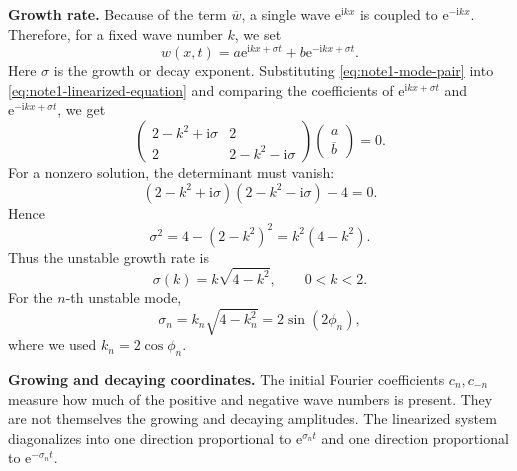 \documentclass{amsart}
\newcounter{note}
\numberwithin{equation}{hw}
\newcommand{\noteheading}[1]{\vspace{1em}\noindent\textbf{#1}}
\begin{document}
\noteheading{Growth rate.}
Because of the term \(\overline{w}\), a single wave
\(\mathrm{e}^{\mathrm{i}kx}\) is coupled to
\(\mathrm{e}^{-\mathrm{i}kx}\).  Therefore, for a fixed wave number \(k\),
we set
\begin{equation}
w(x,t)
=
a\mathrm{e}^{\mathrm{i}kx+\sigma t}
+
b\mathrm{e}^{-\mathrm{i}kx+\sigma t}.
\label{eq:note1-mode-pair}
\end{equation}
Here \(\sigma\) is the growth or decay exponent.  Substituting
\eqref{eq:note1-mode-pair} into \eqref{eq:note1-linearized-equation} and
comparing the coefficients of
\(\mathrm{e}^{\mathrm{i}kx+\sigma t}\) and
\(\mathrm{e}^{-\mathrm{i}kx+\sigma t}\), we get
\begin{equation}
\begin{pmatrix}
2-k^2+\mathrm{i}\sigma & 2
\\
2 & 2-k^2-\mathrm{i}\sigma
\end{pmatrix}
\begin{pmatrix}
a\\
\overline{b}
\end{pmatrix}
=0.
\label{eq:note1-growth-system}
\end{equation}
For a nonzero solution, the determinant must vanish:
\begin{equation}
(2-k^2+\mathrm{i}\sigma)(2-k^2-\mathrm{i}\sigma)-4=0.
\label{eq:note1-determinant-condition}
\end{equation}
Hence
\begin{equation}
\sigma^2
=
4-(2-k^2)^2
=
k^2(4-k^2).
\label{eq:note1-dispersion-relation}
\end{equation}
Thus the unstable growth rate is
\begin{equation}
\sigma(k)=k\sqrt{4-k^2},
\qquad
0<k<2.
\label{eq:note1-growth-rate}
\end{equation}
For the \(n\)-th unstable mode,
\begin{equation}
\sigma_n
=
k_n\sqrt{4-k_n^2}
=
2\sin(2\phi_n),
\label{eq:note1-sigma-n}
\end{equation}
where we used \(k_n=2\cos\phi_n\).

\noteheading{Growing and decaying coordinates.}
The initial Fourier coefficients \(c_n,c_{-n}\) measure how much of the
positive and negative wave numbers is present.  They are not themselves
the growing and decaying amplitudes.  The linearized system diagonalizes
into one direction proportional to \(\mathrm{e}^{\sigma_nt}\) and one
direction proportional to \(\mathrm{e}^{-\sigma_nt}\).
\end{document}
